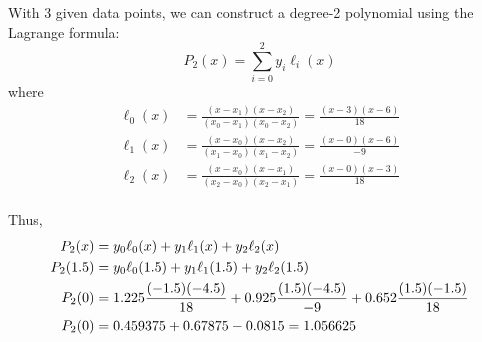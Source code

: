 \documentclass[12pt]{article}
\begin{document}
With 3 given data points, we can construct a degree-2 polynomial using the Lagrange formula:\\
$$P_{2}(x)=\sum_{i=0}^2 y_{i}\ell_{i}(x)$$
where
\begin{align}
\ell_{0}(x)&=\frac{(x-x_1)(x-x_2)}{(x_0-x_1)(x_0-x_2)}=\frac{(x-3)(x-6)}{18} \\
\ell_{1}(x)&=\frac{(x-x_0)(x-x_2)}{(x_1-x_0)(x_1-x_2)}=\frac{(x-0)(x-6)}{-9} \\
\ell_{2}(x)&=\frac{(x-x_0)(x-x_1)}{(x_2-x_0)(x_2-x_1)}=\frac{(x-0)(x-3)}{18}
\end{align} \\
Thus,
\begin{align}
\notag
P_{2}(x) &=y_0\ell_0(x) + y_1\ell_1(x) + y_2\ell_2(x) \\ \notag
P_{2}(1.5) &=y_0\ell_0(1.5) + y_1\ell_1(1.5) + y_2\ell_2(1.5) \\ \notag
P_{2}(0) &= 1.225 \frac{(-1.5)(-4.5)}{18} + 0.925 \frac{(1.5)(-4.5)}{-9} + 0.652 \frac{(1.5)(-1.5)}{18} \\ \notag
P_{2}(0) &= 0.459375 + 0.67875 - 0.0815  = 1.056625 \notag
\end{align}
\end{document}
